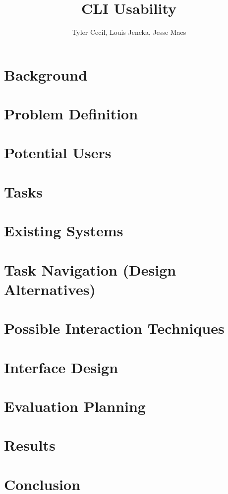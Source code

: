 \documentclass{article}
\title{CLI Usability}
\author{Tyler Cecil, Louis Jencka, Jesse Maes}
\begin{document}
\maketitle{}
\section{Background}
\label{sec:background}


\section{Problem Definition}
\label{sec:problem}


\section{Potential Users}
\label{sec:users}


\section{Tasks}
\label{sec:tasks}


\section{Existing Systems}
\label{sec:existing}



\section{Task Navigation (Design Alternatives)}
\label{sec:tas_nav}


\section{Possible Interaction Techniques}
\label{sec:interact}


\section{Interface Design}
\label{sec:interface}


\section{Evaluation Planning}
\label{sec:eval}


\section{Results}
\label{sec:results}


\section{Conclusion}
\label{sec:conclusion}

\end{document}
